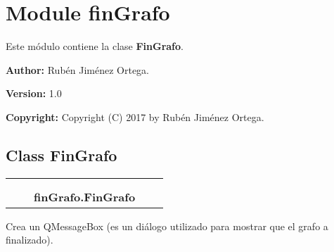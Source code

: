 %
%
%


\section{Module finGrafo}

    \label{finGrafo}
Este módulo contiene la clase \textbf{FinGrafo}.

\textbf{Author:} Rubén Jiménez Ortega.



\textbf{Version:} 1.0



\textbf{Copyright:} Copyright (C) 2017 by Rubén Jiménez Ortega.





\subsection{Class FinGrafo}

    \label{finGrafo:FinGrafo}
\begin{tabular}{cccccc}
\multicolumn{2}{r}{\settowidth{\BCL}{??-4}\multirow{2}{\BCL}{??-4}}
&&
  \\\cline{3-3}
  &&\multicolumn{1}{c|}{}
&&
  \\
&&\multicolumn{2}{l}{\textbf{finGrafo.FinGrafo}}
\end{tabular}

Crea un QMessageBox (es un diálogo utilizado para mostrar que el grafo a 
finalizado).



